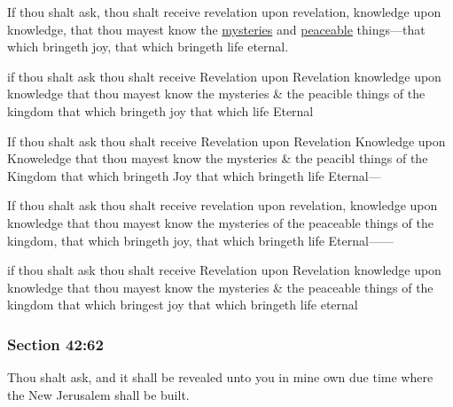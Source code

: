 		If thou shalt ask, thou shalt receive revelation upon revelation, knowledge upon knowledge, that thou mayest know the \hyperref[MYSTERY]{mysteries} and \hyperref[PEACEABLE]{peaceable} things---that which bringeth joy, that which bringeth life eternal.

		\begin{framed}
		\scriptsize
			\begin{compactdesc}
				\item[JSP] if thou shalt ask thou shalt receive Revelation upon Revelation knowledge upon knowledge that thou mayest know the mysteries \& the peacible things of the kingdom that which bringeth joy that which life Eternal
				\item[RB1] If thou shalt ask thou shalt receive Revelation upon Revelation Knowledge upon Knoweledge that thou mayest know the mysteries \& the peacibl things of the Kingdom that which bringeth Joy that which bringeth life Eternal---
				\item[Gilbert] If thou shalt ask thou shalt receive revelation upon revelation, knowledge upon knowledge that thou mayest know the mysteries of the peaceable things of the kingdom, that which bringeth joy, that which bringeth life Eternal------
				\item[Coltrin] if thou shalt ask thou shalt receive Revelation upon Revelation knowledge upon knowledge that thou mayest know the mysteries \& the peaceable things of the kingdom that which bringest joy that which bringeth life eternal
			\end{compactdesc}
		\end{framed}

	\subsubsection{Section 42:62} %
		\label{DC42-62}

		Thou shalt ask, and it shall be revealed unto you in mine own due time where the New Jerusalem shall be built.


